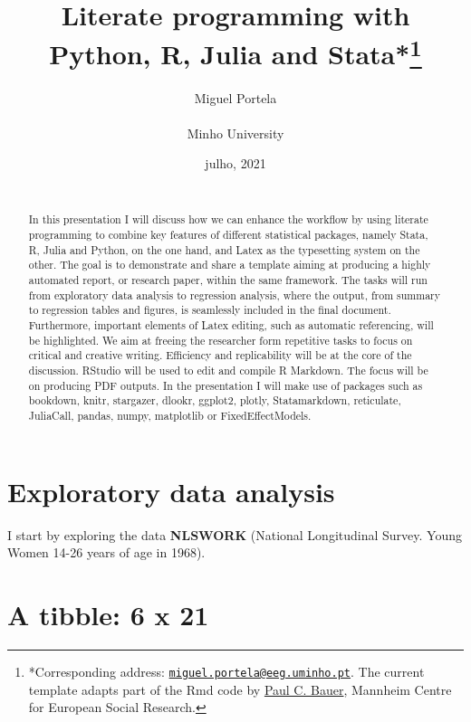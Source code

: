 \documentclass[
  12pt,
]{article}
\title{\hfill\break
\hfill\break
\vspace{1cm}Literate programming with Python, R, Julia and Stata*\footnote{*Corresponding address: \href{mailto:miguel.portela@eeg.uminho.pt}{\nolinkurl{miguel.portela@eeg.uminho.pt}}. The current template adapts part of the Rmd code by \href{https://github.com/paulcbauer/Writing_a_reproducable_paper_in_rmarkdown}{Paul C. Bauer}, Mannheim Centre for European Social Research.}\vspace{0.5cm}\\}
\author{Miguel Portela\\
~\\
Minho University\\}
\date{\hfill\break
\hfill\break
1 julho, 2021\\
~\\}
\begin{document}
\maketitle
\begin{abstract}
\noindent{}In this presentation I will discuss how we can enhance the workflow by using literate programming to combine key features of different statistical packages, namely Stata, R, Julia and Python, on the one hand, and Latex as the typesetting system on the other. The goal is to demonstrate and share a template aiming at producing a highly automated report, or research paper, within the same framework. The tasks will run from exploratory data analysis to regression analysis, where the output, from summary to regression tables and figures, is seamlessly included in the final document. Furthermore, important elements of Latex editing, such as automatic referencing, will be highlighted. We aim at freeing the researcher form repetitive tasks to focus on critical and creative writing. Efficiency and replicability will be at the core of the discussion. RStudio will be used to edit and compile R Markdown. The focus will be on producing PDF outputs. In the presentation I will make use of packages such as bookdown, knitr, stargazer, dlookr, ggplot2, plotly, Statamarkdown, reticulate, JuliaCall, pandas, numpy, matplotlib or FixedEffectModels.\vspace{.8cm}
\end{abstract}

\clearpage

\renewcommand{\baselinestretch}{0.5}\normalsize

\renewcommand{\baselinestretch}{1.1}\normalsize

\clearpage

\hypertarget{exploratory-data-analysis}{%
\section{Exploratory data analysis}\label{exploratory-data-analysis}}

I start by exploring the data \textbf{NLSWORK} (National Longitudinal Survey. Young Women 14-26 years of age in 1968).

\hypertarget{a-tibble-6-x-21}{%
\section{A tibble: 6 x 21}\label{a-tibble-6-x-21}}
\end{document}
